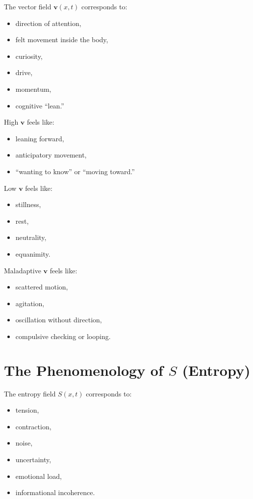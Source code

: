 \documentclass[12pt]{article}
\begin{document}
The vector field $\mathbf{v}(x,t)$ corresponds to:

\begin{itemize}
    \item direction of attention,
    \item felt movement inside the body,
    \item curiosity,
    \item drive,
    \item momentum,
    \item cognitive ``lean.''
\end{itemize}

High $\mathbf{v}$ feels like:

\begin{itemize}
    \item leaning forward,
    \item anticipatory movement,
    \item ``wanting to know'' or ``moving toward.''
\end{itemize}

Low $\mathbf{v}$ feels like:

\begin{itemize}
    \item stillness,
    \item rest,
    \item neutrality,
    \item equanimity.
\end{itemize}

Maladaptive $\mathbf{v}$ feels like:

\begin{itemize}
    \item scattered motion,
    \item agitation,
    \item oscillation without direction,
    \item compulsive checking or looping.
\end{itemize}

\section{The Phenomenology of $S$ (Entropy)}

The entropy field $S(x,t)$ corresponds to:

\begin{itemize}
    \item tension,
    \item contraction,
    \item noise,
    \item uncertainty,
    \item emotional load,
    \item informational incoherence.
\end{itemize}
\end{document}
